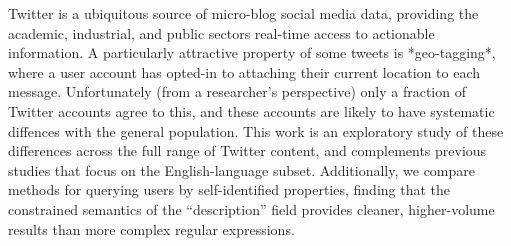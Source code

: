 Twitter is a ubiquitous source of micro-blog social media data, providing the academic, industrial, and public sectors real-time access to actionable information.  A particularly attractive property of some tweets is *geo-tagging*, where a user account has opted-in to attaching their current location to each message.  Unfortunately (from a researcher's perspective) only a fraction of Twitter accounts agree to this, and these accounts are likely to have systematic diffences with the general population.  This work is an exploratory study of these differences across the full range of Twitter content, and complements previous studies that focus on the English-language subset.  Additionally, we compare methods for querying users by self-identified properties, finding that the constrained semantics of the ``description'' field provides cleaner, higher-volume results than more complex regular expressions.
